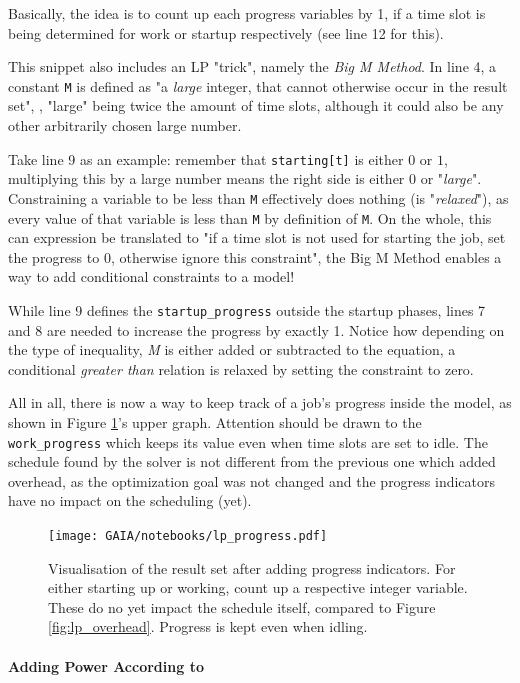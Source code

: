 Basically, the idea is to count up each progress variables by 1, if a time slot is being determined for work or startup respectively (see line 12 for this).

This snippet also includes an LP "trick", namely the \emph{Big M Method}. 
In line 4, a constant \verb|M| is defined as "a \emph{large} integer, that cannot otherwise occur in the result set", , "large" being twice the amount of time slots, although it could also be any other arbitrarily chosen large number.

Take line 9 as an example: 
remember that \verb|starting[t]| is either $0$ or $1$, multiplying this by a large number means the right side is either $0$ or "\emph{large}". 
Constraining a variable to be less than \verb|M| effectively does nothing (is "\emph{relaxed}"), as every value of that variable is less than \verb|M| by definition of \verb|M|. 
On the whole, this can expression be translated to "if a time slot is not used for starting the job, set the progress to 0, otherwise ignore this constraint", the Big M Method enables a way to add conditional constraints to a model!

While line 9 defines the \verb|startup_progress| outside the startup phases, lines 7 and 8 are needed to increase the progress by exactly 1. 
Notice how depending on the type of inequality, \emph{M} is either added or subtracted to the equation, a conditional \emph{greater than} relation is relaxed by setting the constraint to zero.

All in all, there is now a way to keep track of a job's progress inside the model, as shown in Figure \ref{fig:lp_progress}'s upper graph. Attention should be drawn to the \verb|work_progress| which keeps its value even when time slots are set to idle. 
The schedule found by the solver is not different from the previous one which added overhead, as the optimization goal was not changed and the progress indicators have no impact on the scheduling (yet).

\begin{figure}
    \texttt{[image: GAIA/notebooks/lp\_progress.pdf]}
    \caption{Visualisation of the result set after adding progress indicators. For either starting up or working, count up a respective integer variable. These do no yet impact the schedule itself, compared to Figure \ref{fig:lp_overhead}. Progress is kept even when idling.}
    \label{fig:lp_progress}
\end{figure}

\paragraph{Adding Power According to \modelname}

